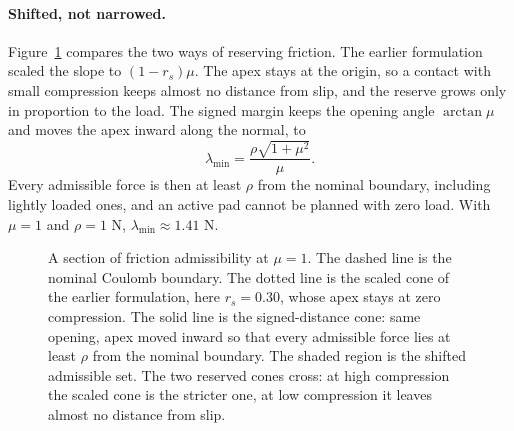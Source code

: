 \paragraph{Shifted, not narrowed.}
Figure~\ref{fig:friction-section} compares the two ways of reserving friction. The earlier formulation scaled the slope to $(1-r_s)\mu$. The apex stays at the origin, so a contact with small compression keeps almost no distance from slip, and the reserve grows only in proportion to the load. The signed margin keeps the opening angle $\arctan\mu$ and moves the apex inward along the normal, to
\begin{equation}
\lambda_{\min}=\frac{\rho\sqrt{1+\mu^2}}{\mu}.
\end{equation}
Every admissible force is then at least $\rho$ from the nominal boundary, including lightly loaded ones, and an active pad cannot be planned with zero load. With $\mu=1$ and $\rho=1$ N, $\lambda_{\min}\approx1.41$ N.

\begin{figure}[htbp]\centering
{}
\caption{A section of friction admissibility at $\mu=1$. The dashed line is the nominal Coulomb boundary. The dotted line is the scaled cone of the earlier formulation, here $r_s=0.30$, whose apex stays at zero compression. The solid line is the signed-distance cone: same opening, apex moved inward so that every admissible force lies at least $\rho$ from the nominal boundary. The shaded region is the shifted admissible set. The two reserved cones cross: at high compression the scaled cone is the stricter one, at low compression it leaves almost no distance from slip.}
\label{fig:friction-section}
\end{figure}

